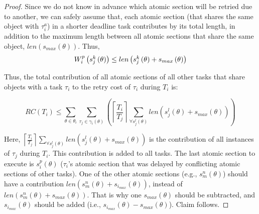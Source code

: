\documentclass[12pt,english]{report}
\newtheorem{proof}{Proof}
\begin{document}
\begin{proof}
Since we do not know in advance which atomic section will be retried
due to another, we can safely assume that, each atomic section (that shares the same object with  $\tau_i^a$) in a shorter deadline task contributes by its total length, in addition to the maximum length between all atomic sections that share the same object, $len(s_{max}(\theta))$. Thus, 
\begin{equation}
\mbox{\ensuremath{W_{i}^{p}\left(s_{j}^{k}\left(\theta\right)\right)\le len\left(s_{j}^{k}\left(\theta\right)+s_{max}\left(\theta\right)\right)}}\label{eq2}\end{equation}


Thus, the total contribution of all atomic sections of all other tasks
that share objects with a task $\tau_i$ 
to the retry cost of $\tau_i$ during $T_i$ is:

\begin{equation}
RC\left(T_{i}\right) \le \sum_{\theta\in\theta_{i}}\sum_{\tau_{j}\in\gamma_i(\theta)}\left(\left\lceil\frac{T_{i}}{T_{j}}\right\rceil\sum_{\forall s_{j}^{l}(\theta)}len\left(s_{j}^{l}(\theta) + s_{max}(\theta)\right)\right)\label{eq3-1}\end{equation}


Here, $\left\lceil\frac{T_{i}}{T_{j}}\right\rceil\sum_{\forall s_{j}^{l}\left(\theta\right)}len\left(s_{j}^{l}\left(\theta\right)+s_{max}\left(\theta\right)\right)$ is  the contribution of all instances of $\tau_{j}$ during $T_{i}$. This contribution is added to all tasks. The last atomic section to execute is $s_{i}^{p}(\theta)$ ($\tau_i$'s atomic section that was delayed by conflicting atomic sections of other tasks). One of the other atomic sections (e.g., $s_{m}^{n}(\theta)$) should have a contribution $len(s_{m}^{n}(\theta)+s_{i_{max}}(\theta))$, instead of $len(s_{m}^{n}(\theta)+s_{max}(\theta))$. That is why one $s_{max}(\theta)$ should be subtracted, and $s_{i_{max}}(\theta)$ should be added (i.e., $s_{i_{max}}(\theta)-s_{max}(\theta)$). Claim follows.
\end{proof}
\end{document}
